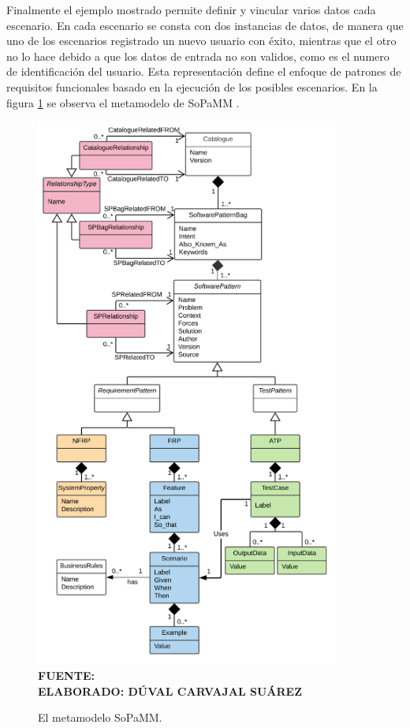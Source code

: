 Finalmente el ejemplo mostrado permite definir y vincular varios datos cada escenario. En cada escenario se consta con dos instancias de datos, de manera que uno de los escenarios registrado un nuevo usuario con éxito, mientras que el otro no lo hace debido a que los datos de entrada no son validos, como es el numero de identificación del usuario. Esta representación define el enfoque de patrones de requisitos funcionales basado en la ejecución de los posibles escenarios. En la figura \ref{fig:metamodelo_sopamm} se observa el metamodelo de SoPaMM \cite{Mohamed}.

\begin{figure}[h!]
	\caption{El metamodelo SoPaMM.}
	\includegraphics[width=10cm]{img/metamodelosopamm.png}
	\label{fig:metamodelo_sopamm}
	\textbf{\\ FUENTE: \cite{Mohamed} \\ ELABORADO: DÚVAL CARVAJAL SUÁREZ}
\end{figure}


